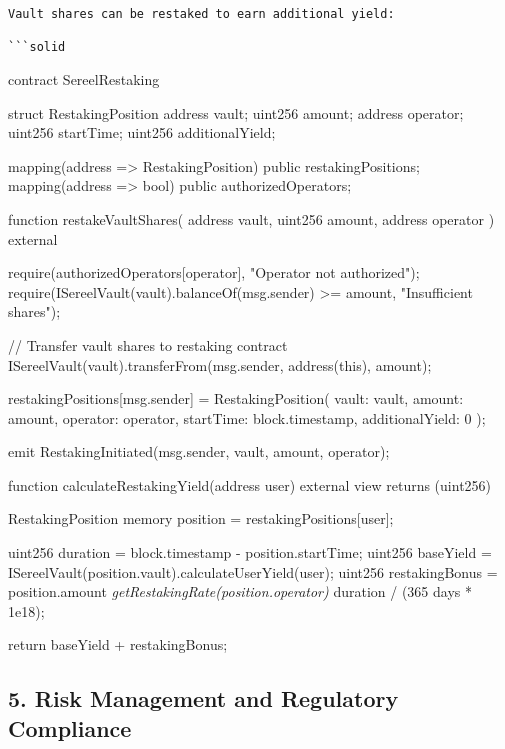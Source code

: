 \documentclass[12pt]{article}
\begin{document}
\begin{lstlisting}
Vault shares can be restaked to earn additional yield:

```solid
\end{lstlisting}
contract SereelRestaking {    struct RestakingPosition {        address vault;        uint256 amount;        address operator;        uint256 startTime;        uint256 additionalYield;    }

    mapping(address => RestakingPosition) public restakingPositions;    mapping(address => bool) public authorizedOperators;

    function restakeVaultShares(        address vault,        uint256 amount,        address operator    ) external {        require(authorizedOperators[operator], "Operator not authorized");        require(ISereelVault(vault).balanceOf(msg.sender) >= amount, "Insufficient shares");

        // Transfer vault shares to restaking contract        ISereelVault(vault).transferFrom(msg.sender, address(this), amount);

        restakingPositions[msg.sender] = RestakingPosition({            vault: vault,            amount: amount,            operator: operator,            startTime: block.timestamp,            additionalYield: 0        });

        emit RestakingInitiated(msg.sender, vault, amount, operator);    }

    function calculateRestakingYield(address user) external view returns (uint256) {        RestakingPosition memory position = restakingPositions[user];

        uint256 duration = block.timestamp - position.startTime;        uint256 baseYield = ISereelVault(position.vault).calculateUserYield(user);        uint256 restakingBonus = position.amount \textit{ getRestakingRate(position.operator) } duration / (365 days * 1e18);

        return baseYield + restakingBonus;    }}
\subsection{5. Risk Management and Regulatory Compliance} %
\end{document}
